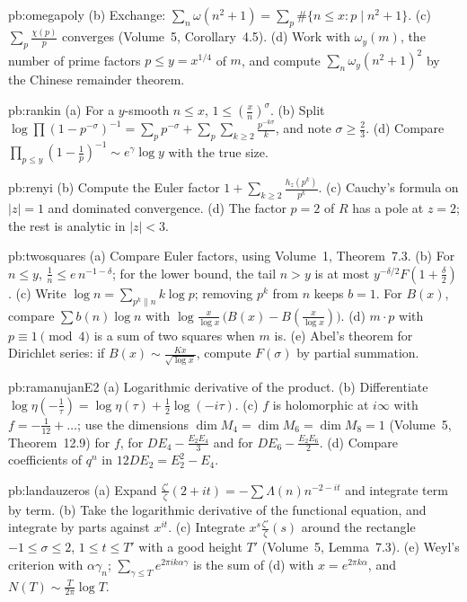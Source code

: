\begin{hint}{pb:omegapoly}
(b) Exchange: $\sum_n\omega(n^2+1)=\sum_p\#\{n\le x:p\mid n^2+1\}$. (c) $\sum_p\frac{\chi(p)}p$ converges (Volume~5, Corollary~4.5). (d) Work with $\omega_y(m)$, the number of prime
factors $p\le y=x^{1/4}$ of $m$, and compute $\sum_n\omega_y(n^2+1)^2$ by the Chinese remainder theorem.
\end{hint}

\begin{hint}{pb:rankin}
(a) For a $y$-smooth $n\le x$, $1\le(\frac xn)^\sigma$. (b) Split $\log\prod(1-p^{-\sigma})^{-1}=\sum_pp^{-\sigma}+\sum_p\sum_{k\ge2}\frac{p^{-k\sigma}}k$, and note $\sigma\ge\frac23$.
(d) Compare $\prod_{p\le y}(1-\frac1p)^{-1}\sim e^\gamma\log y$ with the true size.
\end{hint}

\begin{hint}{pb:renyi}
(b) Compute the Euler factor $1+\sum_{k\ge2}\frac{h_z(p^k)}{p^k}$. (c) Cauchy's formula on $|z|=1$ and dominated convergence. (d) The factor $p=2$ of $R$ has a pole at $z=2$; the rest
is analytic in $|z|<3$.
\end{hint}

\begin{hint}{pb:twosquares}
(a) Compare Euler factors, using Volume~1, Theorem~7.3. (b) For $n\le y$, $\frac1n\le e\,n^{-1-\delta}$; for the lower bound, the tail $n>y$ is at most
$y^{-\delta/2}F(1+\frac\delta2)$. (c) Write $\log n=\sum_{p^k\parallel n}k\log p$; removing $p^k$ from $n$ keeps $b=1$. For $B(x)$, compare $\sum b(n)\log n$ with
$\log\frac x{\log x}\,\bigl(B(x)-B(\frac x{\log x})\bigr)$. (d) $m\cdot p$ with $p\equiv1\pmod4$ is a sum of two squares when $m$ is. (e) Abel's theorem for Dirichlet series: if $B(x)\sim\frac{Kx}{\sqrt{\log x}}$,
compute $F(\sigma)$ by partial summation.
\end{hint}

\begin{hint}{pb:ramanujanE2}
(a) Logarithmic derivative of the product. (b) Differentiate $\log\eta(-\frac1\tau)=\log\eta(\tau)+\frac12\log(-i\tau)$. (c) $f$ is holomorphic at $i\infty$ with $f=-\frac1{12}+\dots$;
use the dimensions $\dim M_4=\dim M_6=\dim M_8=1$ (Volume~5, Theorem~12.9) for $f$, for $DE_4-\frac{E_2E_4}3$ and for $DE_6-\frac{E_2E_6}2$. (d) Compare coefficients of $q^n$ in
$12DE_2=E_2^2-E_4$.
\end{hint}

\begin{hint}{pb:landauzeros}
(a) Expand $\frac{\zeta'}\zeta(2+it)=-\sum\Lambda(n)n^{-2-it}$ and integrate term by term. (b) Take the logarithmic derivative of the functional equation, and integrate by
parts against $x^{it}$. (c) Integrate $x^s\frac{\zeta'}\zeta(s)$ around the rectangle $-1\le\sigma\le2$, $1\le t\le T'$ with a good height $T'$ (Volume~5, Lemma~7.3). (e) Weyl's criterion
with $\alpha\gamma_n$; $\sum_{\gamma\le T}e^{2\pi ik\alpha\gamma}$ is the sum of (d) with $x=e^{2\pi k\alpha}$, and $N(T)\sim\frac T{2\pi}\log T$.
\end{hint}

